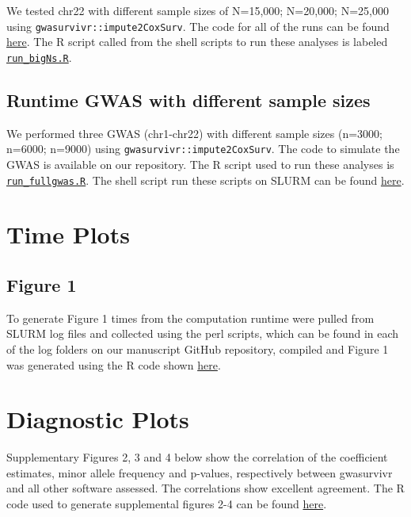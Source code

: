 \documentclass[]{DissertateUSU}
\begin{document}
We tested chr22 with different sample sizes of N=15,000; N=20,000;
N=25,000 using \texttt{gwasurvivr::impute2CoxSurv}. The code for all of
the runs can be found
\href{https://github.com/suchestoncampbelllab/gwasurvivr_manuscript/tree/master/largeN_experiments/code}{here}.
The R script called from the shell scripts to run these analyses is
labeled
\href{https://github.com/suchestoncampbelllab/gwasurvivr_manuscript/tree/master/largeN_experiments/code}{\texttt{run\_bigNs.R}}.

\subsection{Runtime GWAS with different sample
sizes}\label{runtime-gwas-with-different-sample-sizes}

We performed three GWAS (chr1-chr22) with different sample sizes
(n=3000; n=6000; n=9000) using \texttt{gwasurvivr::impute2CoxSurv}. The
code to simulate the GWAS is available on our repository. The R script
used to run these analyses is
\href{https://github.com/suchestoncampbelllab/gwasurvivr_manuscript/tree/master/full_gwas_experiments/code}{\texttt{run\_fullgwas.R}}.
The shell script run these scripts on SLURM can be found
\href{https://github.com/suchestoncampbelllab/gwasurvivr_manuscript/blob/master/full_gwas_experiments/code/submit_fullgwas.sh}{here}.

\section{Time Plots}\label{time-plots}

\subsection{Figure 1}\label{figure-1}

To generate Figure 1 times from the computation runtime were pulled from
SLURM log files and collected using the perl scripts, which can be found
in each of the log folders on our manuscript GitHub repository, compiled
and Figure 1 was generated using the R code shown
\href{https://github.com/suchestoncampbelllab/gwasurvivr_manuscript/blob/master/code/timePlots.R}{here}.

\section{Diagnostic Plots}\label{diagnostic-plots}

Supplementary Figures 2, 3 and 4 below show the correlation of the
coefficient estimates, minor allele frequency and p-values, respectively
between gwasurvivr and all other software assessed. The correlations
show excellent agreement. The R code used to generate supplemental
figures 2-4 can be found
\href{https://github.com/suchestoncampbelllab/gwasurvivr_manuscript/blob/master/supplemental_data/code/SupplementalFigure2-4.R}{here}.
\end{document}

